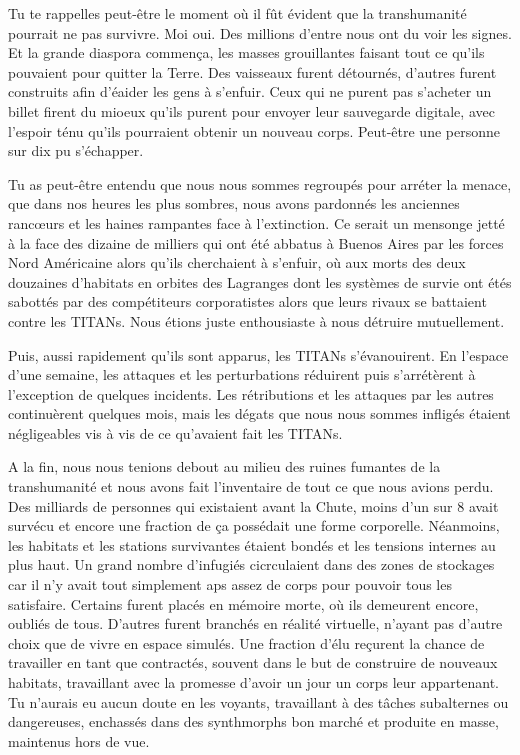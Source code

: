 Tu te rappelles peut-être le moment où il fût évident que la transhumanité pourrait ne pas survivre. Moi oui. Des millions d'entre nous ont du voir les signes. Et la grande diaspora commença, les masses grouillantes faisant tout ce qu'ils pouvaient pour quitter la Terre. Des vaisseaux furent détournés, d'autres furent construits afin d'éaider les gens à s'enfuir. Ceux qui ne purent pas s'acheter un billet firent du mioeux qu'ils purent pour envoyer leur sauvegarde digitale, avec l'espoir ténu qu'ils pourraient obtenir un nouveau corps. Peut-être une personne sur dix pu s'échapper. 

Tu as peut-être entendu que nous nous sommes regroupés pour arréter la menace, que dans nos heures les plus sombres, nous avons pardonnés les anciennes rancœurs et les haines rampantes face à l'extinction. Ce serait un mensonge jetté à la face des dizaine de milliers qui ont été abbatus à Buenos Aires par les forces Nord Américaine alors qu'ils cherchaient à s'enfuir, où aux morts des deux douzaines d'habitats en orbites des Lagranges dont les systèmes de survie ont étés sabottés par des compétiteurs corporatistes alors que leurs rivaux se battaient contre les TITANs. Nous étions juste enthousiaste à nous détruire mutuellement. 

Puis, aussi rapidement qu'ils sont apparus, les TITANs s'évanouirent. En l'espace d'une semaine, les attaques et les perturbations réduirent puis s'arrétèrent à l'exception de quelques incidents. Les rétributions et les attaques par les autres continuèrent quelques mois, mais les dégats que nous nous sommes infligés étaient négligeables vis à vis de ce qu'avaient fait les TITANs. 

A la fin, nous nous tenions debout au milieu des ruines fumantes de la transhumanité et nous avons fait l'inventaire de tout ce que nous avions perdu. Des milliards de personnes qui existaient avant la Chute, moins d'un sur 8 avait survécu et encore une fraction de ça possédait une forme corporelle. Néanmoins, les habitats et les stations survivantes étaient bondés et les tensions internes au plus haut. Un grand nombre d'infugiés cicrculaient dans des zones de stockages car il n'y avait tout simplement aps assez de corps pour pouvoir tous les satisfaire. Certains furent placés en mémoire morte, où ils demeurent encore, oubliés de tous. D'autres furent branchés en réalité virtuelle, n'ayant pas d'autre choix que de vivre en espace simulés. Une fraction d'élu reçurent la chance de travailler en tant que contractés, souvent dans le but de construire de nouveaux habitats, travaillant avec la promesse d'avoir un jour un corps leur appartenant. Tu n'aurais eu aucun doute en les voyants, travaillant à des tâches subalternes ou dangereuses, enchassés dans des synthmorphs bon marché et produite en masse, maintenus hors de vue. 

